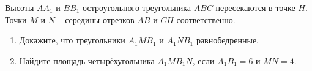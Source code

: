 \begin{ex}
	\begin{condition}
		Высоты \( AA_1  \) и \( BB_1  \) остроугольного треугольника \( ABC  \) пересекаются в точке \( H \). Точки \( M  \) и \( N\) – середины отрезков \( AB  \) и \( CH \) соответственно.
		\begin{enumerate}
			\item Докажите, что треугольники \( A_1MB_1 \) и \( A_1NB_1 \) равнобедренные.
			\item Найдите площадь четырёхугольника \( A_1MB_1N \), если \( A_1B_1=6 \) и \( MN=4 \).
		\end{enumerate}
	\end{condition}
\end{ex}